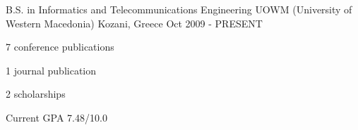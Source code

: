 


\begin{cventries}


\cventry
{B.S. in Informatics and Telecommunications Engineering} %
{UOWM (University of Western Macedonia)} %
{Kozani, Greece} %
{Oct 2009 - PRESENT} %
{ %
\begin{cvitems}
\item {7 conference publications}
\item {1 journal publication}
\item {2 scholarships}
\item {Current GPA 7.48/10.0}
\end{cvitems}
}


\end{cventries}